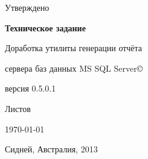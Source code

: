 \begin{titlepage}

\begin{center}

	\Large{Утверждено}

\end{center}

\hrulefill

\vspace{8em}

\begin{center}

	\Large{\textbf{Техническое задание}}

\end{center}

\vspace{6em}

\begin{center}

	\Large{Доработка утилиты генерации отчёта}

	\vspace{1.5em}

	\Large{сервера баз данных MS SQL Server{\copyright}}

	\vspace{2.5em}

	\Large{версия 0.5.0.1}

\end{center}

\vspace{6em}

\vspace{\fill}

\begin{center}

	\Large{Листов \pageref{LastPage}}

\end{center}

\vspace{6em}

\hrulefill

\begin{center}

	\Large{\today}

	\vspace{1.5em}

	\Large{Сидней, Австралия, 2013}

\end{center}

\end{titlepage}

